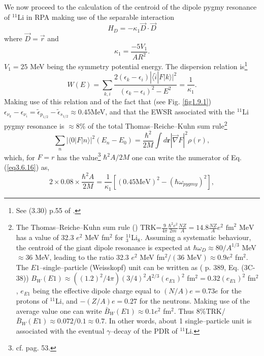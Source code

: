 We now proceed to the calculation of the centroid of the dipole pygmy resonance of $^{11}$Li in  RPA making use of the separable interaction
 \begin{equation}\label{eq2.F.6}
H_D=-\kappa_1\vec D\cdot\vec D
 \end{equation}
where $\vec D=\vec r$ and
 \begin{equation}
\kappa_1=\frac{-5V_1}{AR^2}.
 \end{equation}
  $V_1=25$ MeV being the symmetry potential energy.
The  dispersion relation is\footnote{See (3.30) p.55 of \cite{Bortignon:98}.}
\begin{equation}\label{eq3.6.16}
W(E)=\sum_{k,i}\frac{2(\epsilon_k-\epsilon_i)|\langle \tilde i|F|k\rangle|^2}{(\epsilon_k-\epsilon_i)^2-E^2}=\frac{1}{\kappa_1}.
\end{equation}
 Making use of this relation and of the fact that (see Fig. \ref{fig1.9.1}) 
 $\epsilon_{\nu_k}-\epsilon_{\nu_i}=\tilde\epsilon_{p_{1/2}}-\tilde\epsilon_{s_{1/2}}\approx 0.45 $MeV, and that the EWSR associated with the $^{11}$Li pygmy resonance is $\approx 8$\% of the total Thomas--Reiche--Kuhn sum rule\footnote{The Thomas--Reiche--Kuhn sum rule (\cite{Bohr:75,Bortignon:98}) TRK=$\frac{9}{4\pi} \frac{\hbar^2e^2}{2m} \frac{NZ}{A}=14.8 \frac{NZ}{A} e^2\text{ fm}^2 \text{ MeV}$ has a value of 32.3 $e^2$ MeV fm$^2$ for $^{11}_3$Li$_8$. Assuming a systematic behaviour, the centroid of the giant dipole resonance is expected at $\hbar\omega_D\approx80/A^{1/3}$ MeV $\approx 36$ MeV, leading to the ratio 32.3 $e^2$ MeV fm$^2/(36\text{ MeV})\approx 0.9 e^2$ fm$^2$. The $E1$--single--particle (Weisskopf) unit can be written as (\cite{Bohr:69} p. 389, Eq. (3C-38)) $B_W(E1)\approx ((1.2)^2/4\pi) (3/4)^2 A^{2/3} (e_{E1})^2$ fm$^2=0.32 (e_{E1})^2$ fm$^2$, $e_{E1}$ being the effective dipole charge equal to $(N/A)e=0.73 e$ for the protons of $^{11}$Li, and $-(Z/A)e=0.27$ for the neutrons. Making use of the average value one can write $\bar B_W(E1)\approx0.1 e^2$ fm$^2$. Thus 8\%TRK/$\bar B_W(E1)\approx 0.072/0.1\approx 0.7$. In other words, about 1 single--particle unit is associated with the eventual $\gamma$--decay of the PDR of $^{11}$Li.}
 \begin{equation}
\sum_n |\langle0|F|n\rangle|^2(E_n-E_0)=\frac{\hbar^2}{2M}\int d\mathbf r |\vec\nabla F|^2 \rho(r),
 \end{equation}
 which, for $F=r$ has the value\footnote{cf. \cite{Bertsch:05} pag. 53.} $\hbar^2 A/2M$ one can write the numerator of Eq. (\ref{eq3.6.16}) as, 
\begin{equation}
2\times 0.08\times \frac{\hbar^2A}{2M}=\frac{1}{\kappa_1}[(0.45\text{MeV})^2-(\hbar \omega_{pygmy})^2],
\end{equation}
